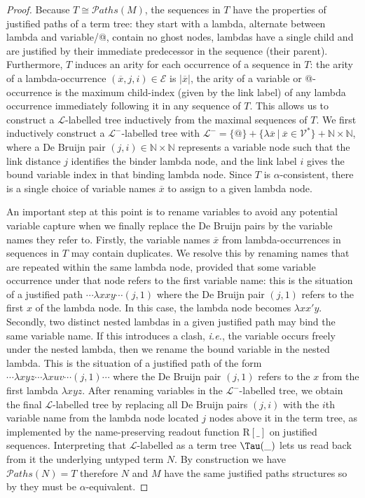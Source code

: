 \documentclass[xchauthor,chkrefs,GCNS,amsmath,amsthm,rotating,leaveRGB]{tcsg}
\theoremstyle{plain}
\theoremstyle{definition}
\def\structisomorphic{\cong}
\def\readout{\mathrm{R}}
\def\nameencoding{\mathcal{E}}
\newcommand{\ctree}{\Tau}
\newcommand{\pathset}{{\mathcal{P}aths}}
\begin{document}
\begin{proof}
Because $T \structisomorphic \pathset (M)$, the sequences in $T$ have the
properties of justified paths of a term tree: they start with a lambda,
alternate between lambda and variable/@, contain no ghost nodes, lambdas have
a single child and are justified by their immediate predecessor in the
sequence (their parent). Furthermore, $T$ induces an arity for each
occurrence of a sequence in $T$: the arity of a lambda-occurrence
$(\overline{x},j,i)\in \nameencoding $ is $|\overline{x}|$, the arity of a
variable or @-occurrence is the maximum child-index (given by the link label)
of any lambda occurrence immediately following it in any sequence of $T$.
This allows us to construct a $\mathcal{L}$-labelled tree inductively from
the maximal sequences of $T$. We first inductively construct a
$\mathcal{L^{-}}$-labelled tree with $\mathcal{L^{-}} = \{ @ \} + \{ \lambda
\overline{x} \ | \ \overline{x} \in \mathcal{V}^{*} \} + \mathbb {N}\times
\mathbb {N}$, where a De Bruijn pair $(j,i)\in \mathbb {N}\times \mathbb {N}$
represents a variable node such that the link distance $j$ identifies the
binder lambda node, and the link label $i$ gives the bound variable index in
that binding lambda node. Since $T$ is $\alpha $-consistent, there is a
single choice of variable names $\overline{x}$ to assign to a given lambda
node.

An important step at this point is to rename variables to avoid any potential
variable capture when we finally replace the De Bruijn pairs by the variable
names they refer to. Firstly, the variable names $\overline{x}$ from
lambda-occurrences in sequences in $T$ may contain duplicates. We resolve
this by renaming names that are repeated within the same lambda node,
provided that some variable occurrence under that node refers to the first
variable name: this is the situation of a justified path  $\cdots \lambda x x
y \cdots (j,1)$ where the De Bruijn pair $(j,1)$ refers to the first $x$ of
the lambda node. In this case, the lambda node becomes $\lambda x x' y$.
Secondly, two distinct nested lambdas in a given justified path may bind the
same variable name. If this introduces a clash, \textit{i.e.}, the variable
occurs freely under the nested lambda, then we rename the bound variable in
the nested lambda. This is the situation of a justified path of the form
$\cdots \lambda{xyz} \cdots \lambda {xuv} \cdots (j,1) \cdots $ where the De
Bruijn pair $(j,1)$ refers to the $x$ from the first lambda $\lambda{x y z}$.
After renaming variables in the $\mathcal{L^{-}}$-labelled tree, we obtain
the final $\mathcal{L}$-labelled tree by replacing all De Bruijn pairs
$(j,i)$ with the $i$th variable name from the lambda node located $j$ nodes
above it in the term tree, as implemented by the name-preserving readout
function $\readout [\_]$ on justified sequences. Interpreting that
$\mathcal{L}$-labelled as a term tree $\ctree (\_ )$ lets us read back from
it the underlying untyped term $N$. By construction we have $\pathset (N) =
T$ therefore $N$ and $M$ have the same justified paths structures so by
 they must be $\alpha
$-equivalent.
\end{proof}
\end{document}
